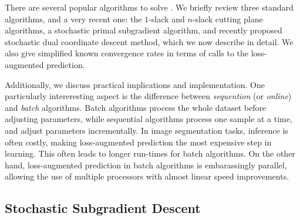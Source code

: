 There are several popular algorithms to solve . We
briefly review three standard algorithms, and a very recent one: the
$1$-slack and $n$-slack cutting plane algorithms, a stochastic primal subgradient
algorithm, and recently proposed stochastic dual coordinate descent method,
which we now describe in detail. We also give simplified known
convergence rates in terms of calls to the loss-augmented prediction.

Additionally, we discuss practical implications and implementation.  One
particularly intereresting aspect is the difference between \emph{sequention}
(or \emph{online}) and \emph{batch} algorithms.  Batch algorithms process the
whole dataset before adjusting parameters, while sequential algorithms process
one sample at a time, and adjust parameters incrementally.
In image segmentation tasks, inference is often costly, making loss-augmented
prediction the most expensive step in learning. This often leads to longer
run-times for batch algorithms. On the other hand, loss-augmented prediction in
batch algorithms is embarassingly parallel, allowing the use of multiple
processors with almost linear speed improvements.

\subsection{Stochastic Subgradient Descent}

